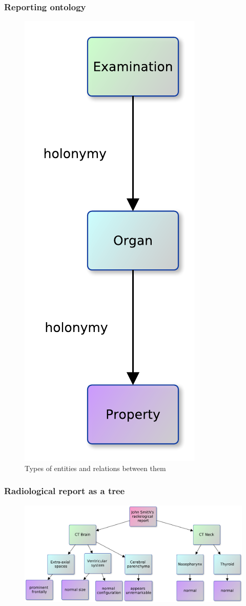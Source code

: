 \documentclass{beamer}
\begin{document}
\begin{frame}
\frametitle{Reporting ontology}
\begin{figure}
	\centering
\includegraphics[width=0.2\linewidth]{../report-semantic}
\caption{Types of entities and relations between them}
\label{fig:report-ontology}
\end{figure}
\end{frame}


\begin{frame}
\frametitle{Radiological report as a tree}
\begin{figure}
	\centering
	\includegraphics[width=1\linewidth]{../report-tree}
	\label{fig:report-tree}
\end{figure}
\end{frame}
\end{document}
